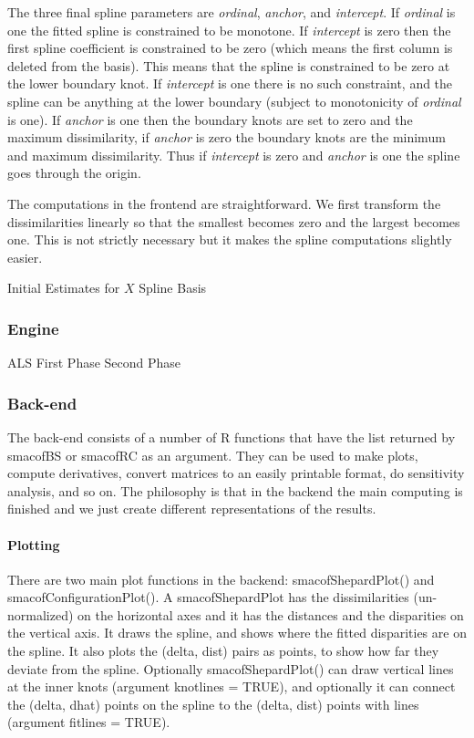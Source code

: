 \documentclass[
  12pt,
]{article}
\begin{document}
The three final spline parameters are \emph{ordinal}, \emph{anchor}, and \emph{intercept}. If \emph{ordinal} is one the fitted spline is constrained to be monotone. If \emph{intercept} is zero then the first spline coefficient is constrained to be zero (which
means the first column is deleted from the basis). This means that the spline
is constrained to be zero at the lower boundary knot. If \emph{intercept} is one
there is no such constraint, and the spline can be anything at the lower boundary
(subject to monotonicity of \emph{ordinal} is one). If \emph{anchor} is one then the
boundary knots are set to zero and the maximum dissimilarity, if \emph{anchor} is
zero the boundary knots are the minimum and maximum dissimilarity. Thus if \emph{intercept} is zero and \emph{anchor} is one the spline goes through the origin.

The computations in the frontend are straightforward. We first transform
the dissimilarities linearly so that the smallest becomes zero and the
largest becomes one. This is not strictly necessary but it makes the
spline computations slightly easier.

Initial Estimates for \(X\) Spline Basis

\subsubsection{Engine}\label{engine}

ALS First Phase Second Phase

\subsubsection{Back-end}\label{back-end}

The back-end consists of a number of R functions that have the list
returned by smacofBS or smacofRC as an argument. They can be used to
make plots, compute derivatives, convert matrices to an easily
printable format, do sensitivity analysis, and so on. The philosophy
is that in the backend the main computing is finished and we
just create different representations of the results.

\paragraph{Plotting}\label{plotting}

There are two main plot functions in the backend: smacofShepardPlot()
and smacofConfigurationPlot(). A smacofShepardPlot has the
dissimilarities (un-normalized) on the horizontal axes and
it has the distances and the disparities on the vertical axis.
It draws the spline, and shows where the fitted disparities are
on the spline. It also plots the (delta, dist) pairs as points,
to show how far they deviate from the spline. Optionally
smacofShepardPlot() can draw vertical lines at the inner knots
(argument knotlines = TRUE), and optionally it can connect
the (delta, dhat) points on the spline to the (delta, dist)
points with lines (argument fitlines = TRUE).
\end{document}
